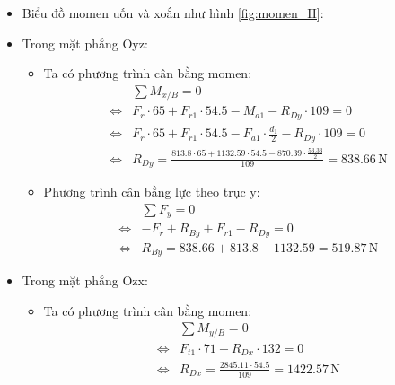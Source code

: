                 \begin{itemize}
                    \item Biểu đồ momen uốn và xoắn như hình \ref{fig:momen_II}:
                    \item Trong mặt phẳng Oyz:
                        \begin{itemize}
                            \item Ta có phương trình cân bằng momen:
                            \begin{align*}
                                &\sum{M_{x/B}} = 0 \\
                                \Leftrightarrow& F_{r} \cdot 65 + F_{r1} \cdot 54.5 - M_{a1} - R_{Dy} \cdot 109 = 0 \\
                                \Leftrightarrow& F_{r} \cdot 65 + F_{r1} \cdot 54.5 - F_{a1} \cdot \frac{d_1}{2} - R_{Dy} \cdot 109 = 0 \\
                                \Leftrightarrow& R_{Dy} = \frac{813.8 \cdot 65 + 1132.59 \cdot 54.5 - 870.39 \cdot \frac{53.33}{2}}{109} = 838.66 \, \mathrm{N}
                            \end{align*}
                            \item Phương trình cân bằng lực theo trục y:
                            \begin{align*}
                                &\sum{F_{y}} = 0 \\
                                \Leftrightarrow& -F_{r} + R_{By} + F_{r1} - R_{Dy} = 0 \\
                                \Leftrightarrow& R_{By} = 838.66 + 813.8 - 1132.59 = 519.87\, \mathrm{N}
                            \end{align*}
                        \end{itemize}
                        \item Trong mặt phẳng Ozx:
                        \begin{itemize}
                            \item Ta có phương trình cân bằng momen:
                            \begin{align*}
                                &\sum{M_{y/B}} = 0 \\
                                \Leftrightarrow& F_{t1} \cdot 71 + R_{Dx} \cdot 132 = 0 \\
                                \Leftrightarrow& R_{Dx} = \frac{2845.11 \cdot 54.5}{109} = 1422.57 \, \mathrm{N}

\end{align*}
\end{itemize}
\end{itemize}
